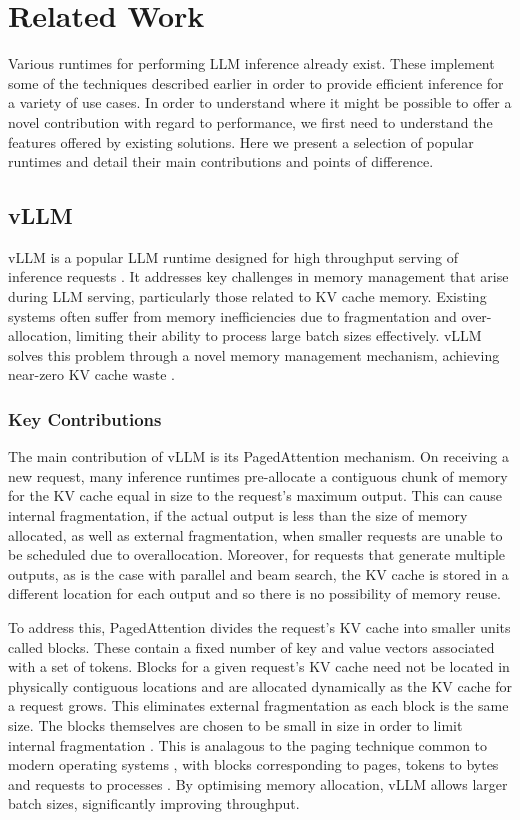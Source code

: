 \documentclass[12pt,twoside]{report}
\begin{document}
\section{Related Work}\label{section:relatedwork}
Various runtimes for performing LLM inference already exist.
These implement some of the techniques described earlier in order to provide efficient inference for a variety of use cases.
In order to understand where it might be possible to offer a novel contribution with regard to performance, we first need to understand the features offered by existing solutions.
Here we present a selection of popular runtimes and detail their main contributions and points of difference.
\subsection{vLLM}
vLLM is a popular LLM runtime designed for high throughput serving of inference requests \cite{kwon2023efficient}.
It addresses key challenges in memory management that arise during LLM serving, particularly those related to KV cache memory.
Existing systems often suffer from memory inefficiencies due to fragmentation and over-allocation, limiting their ability to process large batch sizes effectively.
vLLM solves this problem through a novel memory management mechanism, achieving near-zero KV cache waste \cite{kwon2023efficient}.
\subsubsection{Key Contributions}

The main contribution of vLLM is its PagedAttention mechanism. 
On receiving a new request, many inference runtimes pre-allocate a contiguous chunk of memory for the KV cache equal in size to the request's maximum output.
This can cause internal fragmentation, if the actual output is less than the size of memory allocated, as well as external fragmentation, when smaller requests are unable to be scheduled due to overallocation.
Moreover, for requests that generate multiple outputs, as is the case with parallel and beam search, the KV cache is stored in a different location for each output and so there is no possibility of memory reuse.

To address this, PagedAttention divides the request's KV cache into smaller units called blocks. 
These contain a fixed number of key and value vectors associated with a set of tokens. 
Blocks for a given request's KV cache need not be located in physically contiguous locations and are allocated dynamically as the KV cache for a request grows. 
This eliminates external fragmentation as each block is the same size.
The blocks themselves are chosen to be small in size in order to limit internal fragmentation \cite{kwon2023efficient}.
This is analagous to the paging technique common to modern operating systems \cite{kilburn1962one}, with blocks corresponding to pages, tokens to bytes and requests to processes \cite{kwon2023efficient}.
By optimising memory allocation, vLLM allows larger batch sizes, significantly improving throughput.
\end{document}
